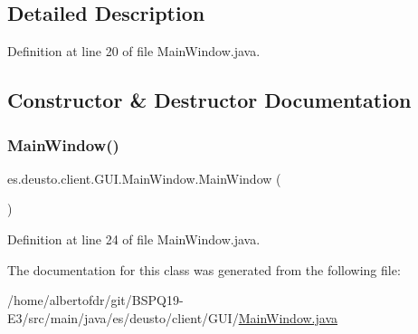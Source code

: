 \subsection{Detailed Description}


Definition at line 20 of file Main\+Window.\+java.



\subsection{Constructor \& Destructor Documentation}
\mbox{\label{classes_1_1deusto_1_1client_1_1_g_u_i_1_1_main_window_a471b4c0c749b9f22c1c74f85a410c1c9}} 
\subsubsection{\texorpdfstring{Main\+Window()}{MainWindow()}}
{\footnotesize\ttfamily es.\+deusto.\+client.\+G\+U\+I.\+Main\+Window.\+Main\+Window (\begin{DoxyParamCaption}{ }\end{DoxyParamCaption})}



Definition at line 24 of file Main\+Window.\+java.



The documentation for this class was generated from the following file\+:\begin{DoxyCompactItemize}
\item 
/home/albertofdr/git/\+B\+S\+P\+Q19-\/\+E3/src/main/java/es/deusto/client/\+G\+U\+I/\hyperlink{_main_window_8java}{Main\+Window.\+java}\end{DoxyCompactItemize}
